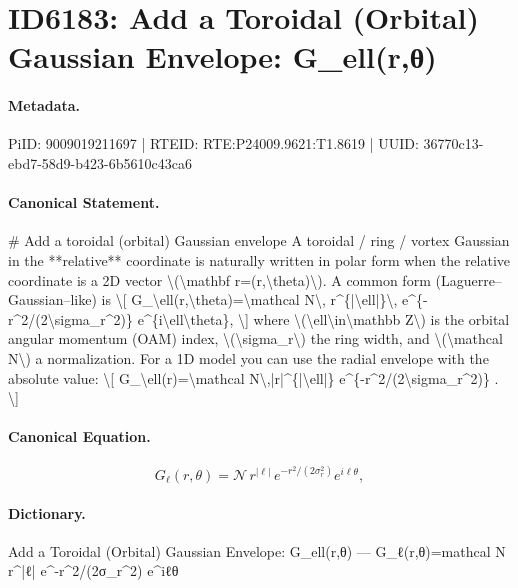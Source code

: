 \section*{ID6183: Add a Toroidal (Orbital) Gaussian Envelope: G\_ell(r,θ)}
\paragraph{Metadata.}
PiID: 9009019211697 | RTEID: RTE:P24009.9621:T1.8619 | UUID: 36770c13-ebd7-58d9-b423-6b5610c43ca6

\paragraph{Canonical Statement.}
\# Add a toroidal (orbital) Gaussian envelope A toroidal / ring / vortex Gaussian in the **relative** coordinate is naturally written in polar form when the relative coordinate is a 2D vector \textbackslash{}(\textbackslash{}mathbf r=(r,\textbackslash{}theta)\textbackslash{}). A common form (Laguerre–Gaussian–like) is \textbackslash{}[ G\_\textbackslash{}ell(r,\textbackslash{}theta)=\textbackslash{}mathcal N\textbackslash{}, r\textasciicircum{}\{|\textbackslash{}ell|\}\textbackslash{}, e\textasciicircum{}\{-r\textasciicircum{}2/(2\textbackslash{}sigma\_r\textasciicircum{}2)\} e\textasciicircum{}\{i\textbackslash{}ell\textbackslash{}theta\}, \textbackslash{}] where \textbackslash{}(\textbackslash{}ell\textbackslash{}in\textbackslash{}mathbb Z\textbackslash{}) is the orbital angular momentum (OAM) index, \textbackslash{}(\textbackslash{}sigma\_r\textbackslash{}) the ring width, and \textbackslash{}(\textbackslash{}mathcal N\textbackslash{}) a normalization. For a 1D model you can use the radial envelope with the absolute value: \textbackslash{}[ G\_\textbackslash{}ell(r)=\textbackslash{}mathcal N\textbackslash{},|r|\textasciicircum{}\{|\textbackslash{}ell|\} e\textasciicircum{}\{-r\textasciicircum{}2/(2\textbackslash{}sigma\_r\textasciicircum{}2)\} . \textbackslash{}]

\paragraph{Canonical Equation.}
\[
G_\ell(r,\theta)=\mathcal N\, r^{|\ell|}\, e^{-r^2/(2\sigma_r^2)} e^{i\ell\theta},
\]

\paragraph{Dictionary.}
Add a Toroidal (Orbital) Gaussian Envelope: G\_ell(r,θ) — G\_ℓ(r,θ)=mathcal N r\textasciicircum{}|ℓ| e\textasciicircum{}-r\textasciicircum{}2/(2σ\_r\textasciicircum{}2) e\textasciicircum{}iℓθ

